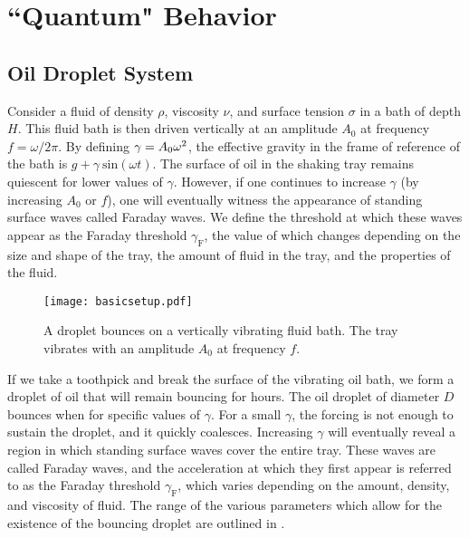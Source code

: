 \chapter{``Quantum" Behavior}
\label{Ch1}

\section{Oil Droplet System}
	    \label{parameters}
	       Consider a fluid of density $\rho$, viscosity $\nu$, and surface tension $\sigma$ in a bath of depth $H$. This fluid bath is then driven vertically at an amplitude $A_0$ at frequency $f=\omega/{2\pi}$. By defining $\mathnormal{\gamma}=A_0\omega^2$, the effective gravity in the frame of reference of the bath is $g+\gamma~\mathrm{sin}(\omega t)$. The surface of oil in the shaking tray remains quiescent for lower values of $\gamma$. However, if one continues to increase $\gamma$ (by increasing $A_0$ or $f$), one will eventually witness the appearance of standing surface waves called Faraday waves. We define the threshold at which these waves appear as the Faraday threshold $\gamma_\mathrm{F}$, the value of which changes depending on the size and shape of the tray, the amount of fluid in the tray, and the properties of the fluid. 
	       
	   \begin{figure}[h]
	       \centering
	    \texttt{[image: basicsetup.pdf]}
	     \caption{A droplet bounces on a vertically vibrating fluid bath. The tray vibrates with an amplitude $A_0$ at frequency $f$.}
	 \label{regime}
	\end{figure}
	       
	    If we take a toothpick and break the surface of the vibrating oil bath, we form a droplet of oil that will remain bouncing for hours. The oil droplet of diameter $D$ bounces when for specific values of $\gamma$. For a small $\gamma$, the forcing is not enough to sustain the droplet, and it quickly coalesces. Increasing $\gamma$ will eventually reveal a region in which standing surface waves cover the entire tray. These waves are called Faraday waves, and the acceleration at which they first appear is referred to as the Faraday threshold $\gamma_\mathrm{F}$, which varies depending on the amount, density, and viscosity of fluid. The range of the various parameters which allow for the existence of the bouncing droplet are outlined in . 
	      
